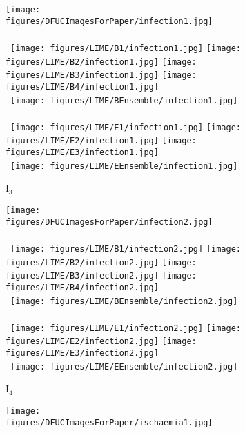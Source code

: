 \documentclass[runningheads]{llncs}
\begin{document}
\begin{figure}[ht!]
\begin{subfigure}[b]{0.10\textwidth}
        \texttt{[image: figures/DFUCImagesForPaper/infection1.jpg]}\\\ \\\ 
        \texttt{[image: figures/LIME/B1/infection1.jpg]} 
        \texttt{[image: figures/LIME/B2/infection1.jpg]} 
        \texttt{[image: figures/LIME/B3/infection1.jpg]} 
        \texttt{[image: figures/LIME/B4/infection1.jpg]}\\\ 
        \texttt{[image: figures/LIME/BEnsemble/infection1.jpg]}\\\ \\\ 
        \texttt{[image: figures/LIME/E1/infection1.jpg]} 
        \texttt{[image: figures/LIME/E2/infection1.jpg]}
        \texttt{[image: figures/LIME/E3/infection1.jpg]}\\\ 
        \texttt{[image: figures/LIME/EEnsemble/infection1.jpg]}
        \caption{I$_3$}
        \label{fig:lime_i3}
    \end{subfigure}
    \hfill
    \begin{subfigure}[b]{0.10\textwidth}
        \centering
        \texttt{[image: figures/DFUCImagesForPaper/infection2.jpg]}\\\ \\\ 
        \texttt{[image: figures/LIME/B1/infection2.jpg]} 
        \texttt{[image: figures/LIME/B2/infection2.jpg]} 
        \texttt{[image: figures/LIME/B3/infection2.jpg]} 
        \texttt{[image: figures/LIME/B4/infection2.jpg]}\\\ 
        \texttt{[image: figures/LIME/BEnsemble/infection2.jpg]}\\\ \\\ 
        \texttt{[image: figures/LIME/E1/infection2.jpg]}
        \texttt{[image: figures/LIME/E2/infection2.jpg]}
        \texttt{[image: figures/LIME/E3/infection2.jpg]}\\\ 
        \texttt{[image: figures/LIME/EEnsemble/infection2.jpg]}
        \caption{I$_4$}
        \label{fig:lime_i4}
    \end{subfigure}
    \hfill
    \begin{subfigure}[b]{0.10\textwidth}
        \centering
        \texttt{[image: figures/DFUCImagesForPaper/ischaemia1.jpg]}\\\ \\\ 

\end{subfigure}
\end{figure}
\end{document}
